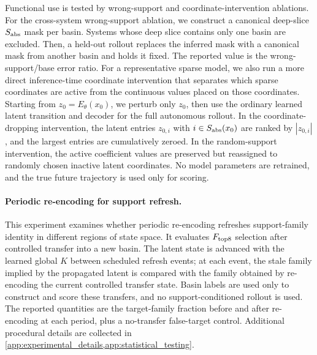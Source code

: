 \documentclass[11pt]{article}
\newcommand{\Enc}{E_\theta}
\theoremstyle{plain}
\theoremstyle{definition}
\begin{document}

Functional use is tested by wrong-support and coordinate-intervention ablations.
For the cross-system wrong-support ablation, we construct a canonical deep-slice \(S_{\rm abs}\) mask per basin. Systems whose deep slice contains only one basin are excluded. Then, a held-out rollout replaces the inferred mask with a canonical mask from another basin and holds it fixed. The reported value is the wrong-support/base error ratio.
For a representative sparse model, we also run a more direct inference-time coordinate intervention that separates which sparse coordinates are active from the continuous values placed on those coordinates. Starting from \(z_0=\Enc(x_0)\), we perturb only \(z_0\), then use the ordinary learned latent transition and decoder for the full autonomous rollout. In the coordinate-dropping intervention, the latent entries \(z_{0,i}\) with \(i\in S_{\rm abs}(x_0)\) are ranked by \(|z_{0,i}|\), and the largest entries are cumulatively zeroed. In the random-support intervention, the active coefficient values are preserved but reassigned to randomly chosen inactive latent coordinates. No model parameters are retrained, and the true future trajectory is used only for scoring.

\paragraph{Periodic re-encoding for support refresh.} This experiment examines whether periodic re-encoding refreshes support-family identity in different regions of state space. It evaluates \(F_{\rm top8}\) selection after controlled transfer into a new basin. The latent state is advanced with the learned global \(K\) between scheduled refresh events; at each event, the stale family implied by the propagated latent is compared with the family obtained by re-encoding the current controlled transfer state. Basin labels are used only to construct and score these transfers, and no support-conditioned rollout is used. The reported quantities are the target-family fraction before and after re-encoding at each period, plus a no-transfer false-target control.
Additional procedural details are collected in \cref{app:experimental_details,app:statistical_testing}.
\end{document}
